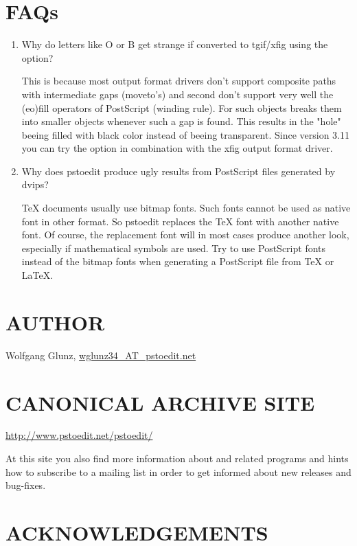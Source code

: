 \documentclass[english,a4paper]{article}
\let\URL\url \let\Email\url \let\File\url
\begin{document}
\section{FAQs}

\begin{enumerate}
\item Why do letters like O or B get strange if converted to tgif/xfig
using the  option?

This is because most output format drivers don't support composite paths with
intermediate gaps (moveto's) and second don't support very well the (eo)fill
operators of PostScript (winding rule). For such objects  breaks
them into smaller objects whenever such a gap is found. This results in the
"hole" beeing filled with black color instead of beeing transparent. Since
version 3.11 you can try the  option in combination with the xfig
output format driver.


\item Why does pstoedit produce ugly results from PostScript files generated
by dvips?

TeX documents usually use bitmap fonts. Such fonts cannot be used as native
font in other format. So pstoedit replaces the TeX font with another native
font. Of course, the replacement font will in most cases produce another
look, especially if mathematical symbols are used.
Try to use PostScript fonts instead of the bitmap fonts when generating a PostScript file from TeX or LaTeX.


\end{enumerate}

\section{AUTHOR}

Wolfgang Glunz, \Email{wglunz34_AT_pstoedit.net}


\section{CANONICAL ARCHIVE SITE}

\URL{http://www.pstoedit.net/pstoedit/}

At this site you also find more information about  and related
programs and hints how to subscribe to a mailing list in order to get informed
about new releases and bug-fixes.


\section{ACKNOWLEDGEMENTS}
\end{document}
